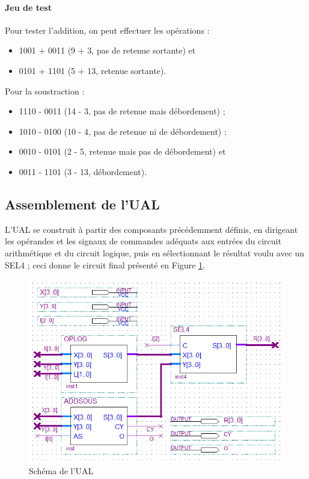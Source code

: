 \documentclass[a4paper,11pt]{article}
\begin{document}
\paragraph{Jeu de test} Pour tester l'addition, on peut effectuer les opérations :
\begin{itemize}
	\item 1001 + 0011 (9 + 3, pas de retenue sortante) et
	\item 0101 + 1101 (5 + 13, retenue sortante).
\end{itemize}
Pour la soustraction :
\begin{itemize}
	\item 1110 - 0011 (14 - 3, pas de retenue mais débordement) ;
	\item 1010 - 0100 (10 - 4, pas de retenue ni de débordement) ;
	\item 0010 - 0101 (2 - 5, retenue mais pas de débordement) et
	\item 0011 - 1101 (3 - 13, débordement).
\end{itemize}


\subsection*{Assemblement de l'UAL}

L'UAL se construit à partir des composants précédemment définis, en dirigeant les opérandes et les signaux de commandes adéquats aux entrées du circuit arithmétique et du circuit logique, puis en sélectionnant le résultat voulu avec un SEL4 ; ceci donne le circuit final présenté en Figure \ref{ual}.

\begin{figure}[h]
	\center
	\includegraphics[scale=0.75]{ual.png}
	\caption{Schéma de l'UAL}
	\label{ual}
\end{figure}
\end{document}
